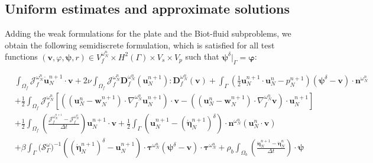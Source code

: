\documentclass[11pt]{article}
\newcommand{\bd}{\boldsymbol}
\theoremstyle{definition}
\begin{document}
\medskip

\subsection{Uniform estimates and approximate solutions}

Adding the weak formulations for the plate and the Biot-fluid subproblems, we obtain the following semidiscrete formulation, which is satisfied for all test functions $(\bd{v}, \varphi, \bd{\psi}, r) \in V^{\omega^{n}_{N}}_{f} \times H^{2}(\Gamma) \times V_{s} \times V_{p}$ such that $\bd{\psi}^{\delta}|_{\Gamma} = \bd{\varphi}$:

\begin{small}
\begin{equation}\label{semi1}
\begin{aligned}
&\int_{\Omega_{f}} \mathcal{J}^{\omega^{n}_{N}}_{f} \boldsymbol{\dot{u}}^{n + 1}_{N} \cdot \boldsymbol{v} 
+ 2\nu \int_{\Omega_{f}} \mathcal{J}^{\omega^{n}_{N}}_{f} \boldsymbol{D}^{\omega^{n}_{N}}_{f}(\boldsymbol{u}^{n + 1}_{N}) : \boldsymbol{D}^{\omega^{n}_{N}}_{f}(\boldsymbol{v}) + \int_{\Gamma} \left(\frac{1}{2}\boldsymbol{u}^{n + 1}_{N} \cdot \boldsymbol{u}^{n}_{N} - p^{n + 1}_{N}\right)(\boldsymbol{\psi}^{\delta} - \boldsymbol{v})\cdot \boldsymbol{n}^{\omega^{n}_{N}} 
\\
&+ \frac{1}{2} \int_{\Omega_{f}} \mathcal{J}^{\omega^{n}_{N}}_{f} \left[\left(\left(\boldsymbol{u}^{n}_{N} - \bd{w}^{n + 1}_{N}\right) \cdot \nabla^{\omega^{n}_{N}}_{f} \boldsymbol{u}^{n + 1}_{N}\right) \cdot \boldsymbol{v} - \left(\left(\boldsymbol{u}^{n}_{N} - \bd{w}^{n + 1}_{N}\right) \cdot \nabla^{\omega^{n}_{N}}_{f} \boldsymbol{v}\right) \cdot \boldsymbol{u}^{n + 1}_{N}\right] 
\\
&+ \frac{1}{2} \int_{\Omega_{f}} \left(\frac{\mathcal{J}^{\omega^{n + 1}_{N}}_{f} - \mathcal{J}^{\omega^{n}_{N}}_{f}}{\Delta t}\right) \boldsymbol{u}^{n + 1}_{N} \cdot \boldsymbol{v} + \frac{1}{2} \int_{\Gamma} \left(\boldsymbol{u}^{n + 1}_{N} - \left(\boldsymbol{\dot{\eta}}^{n + 1}_{N}\right)^{\delta}\right) \cdot \boldsymbol{n}^{\omega^{n}_{N}} (\boldsymbol{u}^{n}_{N} \cdot \boldsymbol{v}) 
\\
&+ \beta \int_{\Gamma} \Big(\mathcal{S}^{\omega}_{\Gamma}\Big)^{-1} \left(\left(\boldsymbol{\dot{\eta}}^{n + 1}_{N}\right)^{\delta} - \boldsymbol{u}^{n + 1}_{N}\right) \cdot \boldsymbol{\tau}^{\omega^{n}_{N}} (\boldsymbol{\psi}^{\delta} - \boldsymbol{v}) \cdot \boldsymbol{\tau}^{\omega^{n}_{N}} + \rho_{b} \int_{\Omega_{b}} \left(\frac{\boldsymbol{\dot{\eta}}^{n + 1}_{N} - \boldsymbol{\dot{\eta}}^{n}_{N}}{\Delta t}\right) \cdot \boldsymbol{\psi} 

\end{aligned}
\end{equation}
\end{small}
\end{document}
